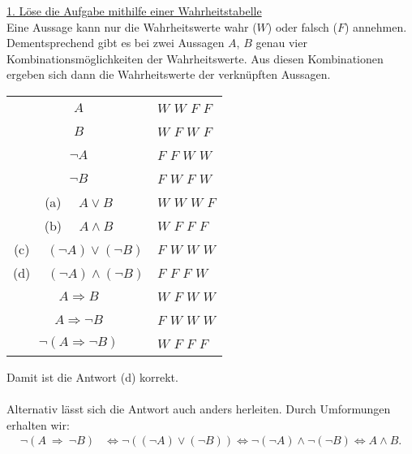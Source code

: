 \underline{1. Löse die Aufgabe mithilfe einer Wahrheitstabelle}\\
Eine Aussage kann nur die Wahrheitswerte wahr ($ W $) oder falsch ($ F $) annehmen.
Dementsprechend gibt es bei zwei Aussagen $ A $, $ B $ genau vier Kombinationsmöglichkeiten der Wahrheitswerte.
Aus diesen Kombinationen ergeben sich dann die Wahrheitswerte der verknüpften Aussagen.
\begin{center}
	\begin{tabular}{cllll}
		\hline
		\multicolumn{1}{c|}{$A$} & \multicolumn{4}{l}{$W$ $W$ $F$ $F$} \\
		\multicolumn{1}{c|}{$B$} & \multicolumn{4}{l}{$W$ $F$ $W$ $F$} \\ 
		\multicolumn{1}{c|}{$\neg A$} & \multicolumn{4}{l}{$F$ $F$ $W$ $W$} \\
		\multicolumn{1}{c|}{$\neg B$} & \multicolumn{4}{l}{$F$ $W$ $F$ $W$} \\
		\hline
		\multicolumn{1}{c|}{(a) \ \ $ A \vee B$} & \multicolumn{4}{l}{$W$ $W$ $W$ $F$} \\ 
		\multicolumn{1}{c|}{(b) \ \ $ A \wedge B$} & \multicolumn{4}{l}{$W$ $F$ $F$ $F$} \\ 
		\multicolumn{1}{c|}{(c) \ \ $ (\neg A) \vee (\neg B)$} & \multicolumn{4}{l}{$F$ $W$ $W$ $W$} \\
		\multicolumn{1}{c|}{(d) \ \ $ (\neg A) \wedge (\neg B)$} & \multicolumn{4}{l}{$F$ $F$ $F$ $W$} \\
		\hline
		\multicolumn{1}{c|}{$ A \Rightarrow B$} & \multicolumn{4}{l}{$W$ $F$ $W$ $W$} \\ 
		\multicolumn{1}{c|}{$ A \Rightarrow  \neg B$} & \multicolumn{4}{l}{$F$ $W$ $W$ $W$} \\ 
		\multicolumn{1}{c|}{$ \neg(A \Rightarrow  \neg B)$} & \multicolumn{4}{l}{$W$ $F$ $F$ $F$} \\ 
		\hline
	\end{tabular}
\end{center}
Damit ist die Antwort (d) korrekt. \\
\\
Alternativ lässt sich die Antwort auch anders herleiten. Durch Umformungen erhalten wir:
\begin{align*}
	\neg (A \ \Rightarrow \ \neg B)
	&\Leftrightarrow
	\neg ((\neg A) \vee (\neg B))
	\Leftrightarrow
	\neg (\neg A) \wedge \neg(\neg B)
	\Leftrightarrow
	A \wedge B.
\end{align*}


\newpage

